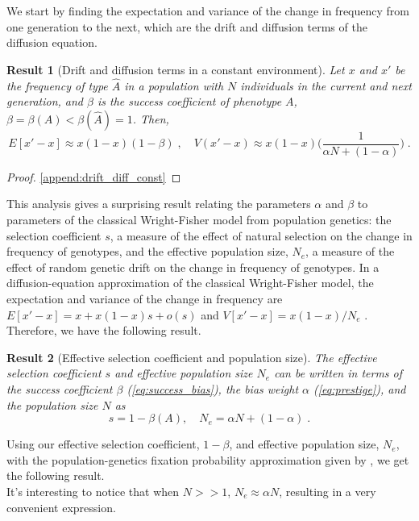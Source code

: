 \documentclass[12pt]{extarticle}
\newtheorem{result}{Result}
\begin{document}
We start by finding the expectation and variance of the change in frequency from one generation to the next, which are the drift and diffusion terms of the diffusion equation.\\

\begin{result}[Drift and diffusion terms in a constant environment]
Let $x$ and $x'$ be the frequency of type $\hat{A}$ in a population with $N$ individuals in the current and next generation, and  $\beta$ is the success coefficient of phenotype $A$, $\beta = \beta(A) < \beta(\hat{A}) = 1$.
Then,
\begin{equation}
E[x'-x] \approx x(1-x)(1-\beta) \;, 
\quad
V(x'-x) \approx x(1-x)\Big(\frac{1}{\alpha N + (1-\alpha)}\Big) \;.
\end{equation} 
\end{result}

\begin{proof}
\cref{append:drift_diff_const}
\end{proof}


This analysis gives a surprising result relating the parameters $\alpha$ and $\beta$ to parameters of the classical Wright-Fisher model from population genetics:
the selection coefficient $s$, a measure of the effect of natural selection on the change in frequency of genotypes, and the effective population size, $N_e$, a measure of the effect of random genetic drift on the change in frequency of genotypes. 
In a diffusion-equation approximation of the classical Wright-Fisher model, the expectation and variance of the change in frequency are $E[x'-x]=x+x(1-x)s+o(s)$ and $V[x'-x]=x(1-x)/N_e$ \citep[eq.~7]{kimura}. 
Therefore, we have the following result.\\

\begin{result}[Effective selection coefficient and population size]\label{res:selection_coef}
The effective selection coefficient $s$ and effective population size $N_e$ can be written in terms of the success coefficient $\beta$ (\cref{eq:success_bias}), the bias weight $\alpha$ (\cref{eq:prestige}), and the population size $N$ as 
\begin{equation}
s=1-\beta(A), \quad N_e=\alpha N + (1-\alpha) \;.
\end{equation}
\end{result}

Using our effective selection coefficient, $1-\beta$, and effective population size, $N_e$, with the population-genetics fixation probability approximation given by \citet[eq.~8]{kimura}, we get the following result.\\
It's interesting to notice that when $N>>1$, $N_e \approx \alpha N$, resulting in a very convenient expression.\\
\end{document}
